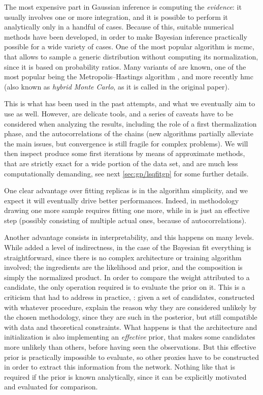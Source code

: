The most expensive part in Gaussian inference is computing the
\textit{evidence}: it usually involves one or more integration, and it is
possible to perform it analytically only in a handful of cases.
%
Because of this, suitable numerical methods have been developed, in order to
make Bayesian inference practically possible for a wide variety of cases.
%
One of the most popular algorithm is \acrfull{mcmc}, that allows to sample a
generic distribution without computing its normalization, since it is based on
probability ratios.
%
Many variants of \mcmc are known, one of the most popular being the
Metropolis--Hastings algorithm \cite{Metropolis:1953,Hastings:1970}, and more
recently \acrfull{hmc} \cite{Duane:1987de} (also known as \textit{hybrid Monte
Carlo}, as it is called in the original paper).

This is what has been used in the past attempts, and what we eventually aim to
use as well.
However, \mcmc are delicate tools, and a series of caveats have to be
considered when analyzing the results, including the role of a first
thermalization phase, and the autocorrelations of the chains (new algorithms
partially alleviate the main issues, but convergence is still fragile for
complex problems). 
%
We will then inspect produce some first iterations by means of approximate
methods, that are strictly exact for a wide portion of the data set, and are
much less computationally demanding, see next \cref{sec:gp/lsqfitgp} for some
further details.

One clear advantage over fitting replicas is in the algorithm simplicity, and
we expect it will eventually drive better performances.
Indeed, in \nnpdf methodology drawing one more sample requires fitting one \nn
more, while in \mcmc is just an effective step (possibly consisting of multiple
actual ones, because of autocorrelations).

Another advantage consists in interpretability, and this happens on many levels.
%
While \nn added a level of indirectness, in the case of the Bayesian fit
everything is straightforward, since there is no complex architecture or
training algorithm involved; the ingredients are the likelihood and \pdfs
prior, and the composition is simply the normalized product.
%
In order to compare the weight attributed to a \pdf candidate, the only
operation required is to evaluate the prior on it.
%
This is a criticism that \nnpdf had to address in practice,
\cite{Courtoy:2022ocu}: given a set of candidates, constructed with whatever
procedure, explain the reason why they are considered unlikely by the chosen
methodology, since they are such in the posterior, but still compatible with
data and theoretical constraints.
What happens is that the \nn architecture and initialization is also
implementing an \textit{effective} prior, that makes some candidates more unlikely than
others, before having seen the observations.
But this effective prior is practically impossible to evaluate, so other
proxies have to be constructed in order to extract this information from the
network.
%
Nothing like that is required if the prior is known analytically, since it can
be explicitly motivated and evaluated for comparison.

